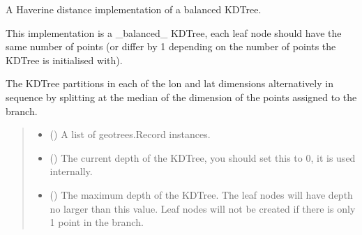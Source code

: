 \documentclass[letterpaper,10pt,english]{sphinxmanual}
\begin{document}
\begin{fulllineitems}
\label{\detokenize{kdtree:geotrees.kdtree.KDTree}}
\pysigstartsignatures
\pysiglinewithargsret
{}
{\sphinxparamcomma {}\sphinxparamcomma {}}
{}
\pysigstopsignatures
\sphinxAtStartPar
A Haverine distance implementation of a balanced KDTree.

\sphinxAtStartPar
This implementation is a \_balanced\_ KDTree, each leaf node should have the
same number of points (or differ by 1 depending on the number of points
the KDTree is initialised with).

\sphinxAtStartPar
The KDTree partitions in each of the lon and lat dimensions alternatively
in sequence by splitting at the median of the dimension of the points
assigned to the branch.
\begin{quote}\begin{description}
\begin{itemize}
\item {}
\sphinxAtStartPar
{} (\sphinxstyleliteralemphasis{\sphinxupquote{{[}}}{\hyperref[\detokenize{record:geotrees.record.Record}]{\sphinxcrossref{\sphinxstyleliteralemphasis{\sphinxupquote{Record}}}}}\sphinxstyleliteralemphasis{\sphinxupquote{{]}}}) \textendash{} A list of geotrees.Record instances.

\item {}
\sphinxAtStartPar
{} () \textendash{} The current depth of the KDTree, you should set this to 0, it is used
internally.

\item {}
\sphinxAtStartPar
{} () \textendash{} The maximum depth of the KDTree. The leaf nodes will have depth no
larger than this value. Leaf nodes will not be created if there is
only 1 point in the branch.

\end{itemize}

\end{description}\end{quote}


\end{fulllineitems}
\end{document}
